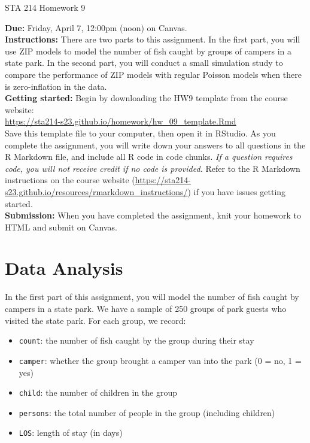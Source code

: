 \documentclass[11pt]{article}
\begin{document}
\begin{center}
\Large
STA 214 Homework 9\\
\normalsize
\vspace{5mm}
\end{center}

\noindent \textbf{Due:} Friday, April 7, 12:00pm (noon) on Canvas.\\ 

\noindent \textbf{Instructions:} There are two parts to this assignment. In the first part, you will use ZIP models to model the number of fish caught by groups of campers in a state park. In the second part, you will conduct a small simulation study to compare the performance of ZIP models with regular Poisson models when there is zero-inflation in the data.\\

\noindent \textbf{Getting started:} Begin by downloading the HW9 template from the course website:\\

\url{https://sta214-s23.github.io/homework/hw_09_template.Rmd}\\

\noindent Save this template file to your computer, then open it in RStudio. As you complete the assignment, you will write down your answers to all questions in the R Markdown file, and include all R code in code chunks. \textit{If a question requires code, you will not receive credit if no code is provided.} Refer to the R Markdown instructions on the course website (\url{https://sta214-s23.github.io/resources/rmarkdown_instructions/}) if you have issues getting started.\\

\noindent \textbf{Submission:} When you have completed the assignment, knit your homework to HTML and submit on Canvas. 

\section*{Data Analysis}

In the first part of this assignment, you will model the number of fish caught by campers in a state park. We have a sample of 250 groups of park guests who visited the state park. For each group, we record:

\begin{itemize}
\item \texttt{count}: the number of fish caught by the group during their stay
\item \texttt{camper}: whether the group brought a camper van into the park (0 = no, 1 = yes)
\item \texttt{child}: the number of children in the group
\item \texttt{persons}: the total number of people in the group (including children)
\item \texttt{LOS}: length of stay (in days)
\end{itemize}
\end{document}
